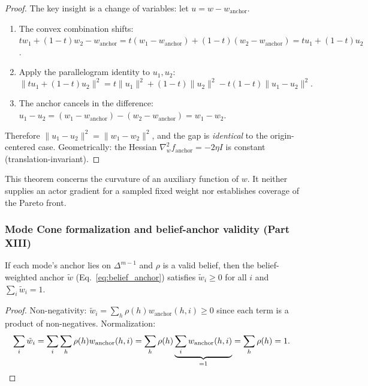 \begin{proof}
The key insight is a change of variables: let $u = w - w_{\mathrm{anchor}}$.
\begin{enumerate}
    \item The convex combination shifts: $t w_1 + (1{-}t)w_2 - w_{\mathrm{anchor}} = t(w_1 - w_{\mathrm{anchor}}) + (1{-}t)(w_2 - w_{\mathrm{anchor}}) = tu_1 + (1{-}t)u_2$.
    \item Apply the parallelogram identity to $u_1, u_2$: $$\|tu_1 + (1{-}t)u_2\|^2 = t\|u_1\|^2 + (1{-}t)\|u_2\|^2 - t(1{-}t)\|u_1 - u_2\|^2.$$
    \item The anchor cancels in the difference: $u_1 - u_2 = (w_1 - w_{\mathrm{anchor}}) - (w_2 - w_{\mathrm{anchor}}) = w_1 - w_2$.
\end{enumerate}
Therefore $\|u_1 - u_2\|^2 = \|w_1 - w_2\|^2$, and the gap is \emph{identical} to the origin-centered case.  Geometrically: the Hessian $\nabla^2_w f_{\mathrm{anchor}} = -2\eta I$ is constant (translation-invariant).
\end{proof}

\begin{remark}
This theorem concerns the curvature of an auxiliary function of $w$. It neither supplies an actor gradient for a sampled fixed weight nor establishes coverage of the Pareto front.
\end{remark}

\subsubsection{Mode Cone formalization and belief-anchor validity (Part XIII)}

\begin{theorem}
\label{thm:belief_anchor}
If each mode's anchor lies on $\Delta^{m-1}$ and $\rho$ is a valid belief, then the belief-weighted anchor $\tilde{w}$ (Eq.~\ref{eq:belief_anchor}) satisfies $\tilde{w}_i \ge 0$ for all $i$ and $\sum_i \tilde{w}_i = 1$.
\end{theorem}

\begin{proof}
Non-negativity: $\tilde{w}_i = \sum_h \rho(h) w_{\mathrm{anchor}}(h,i) \ge 0$ since each term is a product of non-negatives.  Normalization:
\begin{align}
    \sum_i \tilde{w}_i &= \sum_i \sum_h \rho(h) w_{\mathrm{anchor}}(h,i) = \sum_h \rho(h) \underbrace{\sum_i w_{\mathrm{anchor}}(h,i)}_{=1} = \sum_h \rho(h) = 1. \qedhere
\end{align}
\end{proof}

